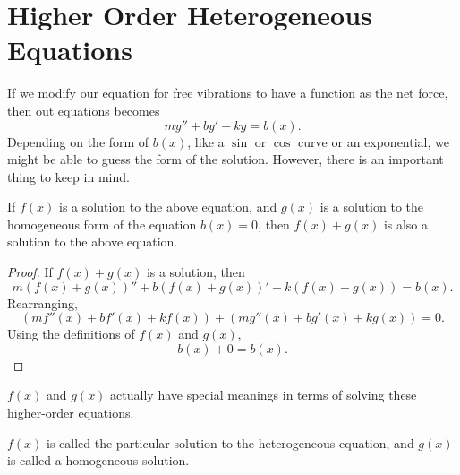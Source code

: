 \section{Higher Order Heterogeneous Equations}
\noindent
If we modify our equation for free vibrations to have a function as the net force, then out equations becomes
\begin{equation*}
	my'' + by' + ky = b(x).
\end{equation*}
Depending on the form of $b(x)$, like a $\sin$ or $\cos$ curve or an exponential, we might be able to guess the form of the solution.
However, there is an important thing to keep in mind.

\begin{theorem}
	If $f(x)$ is a solution to the above equation, and $g(x)$ is a solution to the homogeneous form of the equation $b(x) = 0$, then $f(x) + g(x)$ is also a solution to the above equation.
\end{theorem}
\begin{proof}
	If $f(x) + g(x)$ is a solution, then
	\begin{equation*}
		m\left(f(x) + g(x)\right)'' + b\left(f(x) + g(x)\right)' + k\left(f(x) + g(x)\right) = b(x).
	\end{equation*}
	Rearranging,
	\begin{equation*}
		\left(mf''(x) + bf'(x) + kf(x)\right) + \left(mg''(x) + bg'(x) + kg(x)\right) = 0.
	\end{equation*}
	Using the definitions of $f(x)$ and $g(x)$,
	\begin{equation*}
		b(x) + 0 = b(x).
	\end{equation*}
\end{proof}

\noindent
$f(x)$ and $g(x)$ actually have special meanings in terms of solving these higher-order equations.
\begin{definition}
	$f(x)$ is called the particular solution to the heterogeneous equation, and $g(x)$ is called a homogeneous solution.
\end{definition}



